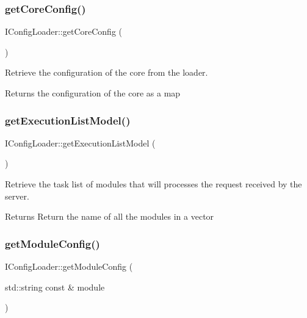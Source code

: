 \subsubsection{\texorpdfstring{get\+Core\+Config()}{getCoreConfig()}}
{\footnotesize\ttfamily I\+Config\+Loader\+::get\+Core\+Config (\begin{DoxyParamCaption}{ }\end{DoxyParamCaption})\hspace{0.3cm}{\ttfamily [pure virtual]}}



Retrieve the configuration of the core from the loader. 

\begin{DoxyReturn}{Returns}
the configuration of the core as a map 
\end{DoxyReturn}
\mbox{\label{classxzia_1_1IConfigLoader_a978f88a37cacd8ad84bd3ae995e5a7ba}} 
\subsubsection{\texorpdfstring{get\+Execution\+List\+Model()}{getExecutionListModel()}}
{\footnotesize\ttfamily I\+Config\+Loader\+::get\+Execution\+List\+Model (\begin{DoxyParamCaption}{ }\end{DoxyParamCaption})\hspace{0.3cm}{\ttfamily [pure virtual]}}



Retrieve the task list of modules that will processes the request received by the server. 

\begin{DoxyReturn}{Returns}
Return the name of all the modules in a vector 
\end{DoxyReturn}
\mbox{\label{classxzia_1_1IConfigLoader_acc495c84824d91f3baf1bfdbce2d4f60}} 
\subsubsection{\texorpdfstring{get\+Module\+Config()}{getModuleConfig()}}
{\footnotesize\ttfamily I\+Config\+Loader\+::get\+Module\+Config (\begin{DoxyParamCaption}\item[{std\+::string const \&}]{module }\end{DoxyParamCaption})\hspace{0.3cm}{\ttfamily [pure virtual]}}



